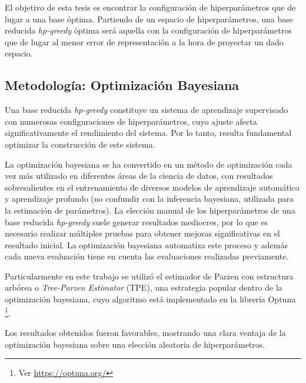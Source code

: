 El objetivo de esta tesis es encontrar la configuración de hiperparámetros que de lugar a una base óptima. Partiendo de un espacio de hiperparámetros, una base reducida \textit{hp-greedy} óptima será aquella con la configuración de hiperparámetros que de lugar al menor error de representación a la hora de proyectar un dado espacio. 


\subsection*{Metodología: Optimización Bayesiana}

Una base reducida \textit{hp-greedy} constituye un sistema de aprendizaje supervisado con numerosas configuraciones de hiperparámetros, cuyo ajuste afecta significativamente el rendimiento del sistema. Por lo tanto, resulta fundamental optimizar la construcción de este sistema.

La optimización bayesiana \cite{7352306, https://doi.org/10.48550/arxiv.1012.2599} se ha convertido en un método de optimización cada vez más utilizado en diferentes áreas de la ciencia de datos, con resultados sobresalientes en el entrenamiento de diversos modelos de aprendizaje automático y aprendizaje profundo (no confundir con la inferencia bayesiana, utilizada para la estimación de parámetros). La elección manual de los hiperparámetros de una base reducida \textit{hp-greedy} suele generar resultados mediocres, por lo que es necesario realizar múltiples pruebas para obtener mejoras significativas en el resultado inicial. La optimización bayesiana automatiza este proceso y además cada nueva evaluación tiene en cuenta las evaluaciones realizadas previamente. 

Particularmente en este trabajo se utilizó el estimador de Parzen con estructura arbórea o \textit{Tree-Parzen Estimator} (TPE), una estrategia popular dentro de la optimización bayesiana, cuyo algoritmo está implementado en la librería Optuna \cite{optuna_2019} \footnote{Ver \url{https://optuna.org/}}. 


Los resultados obtenidos fueron favorables, mostrando una clara ventaja de la optimización bayesiana sobre una elección aleatoria de hiperparámetros.

